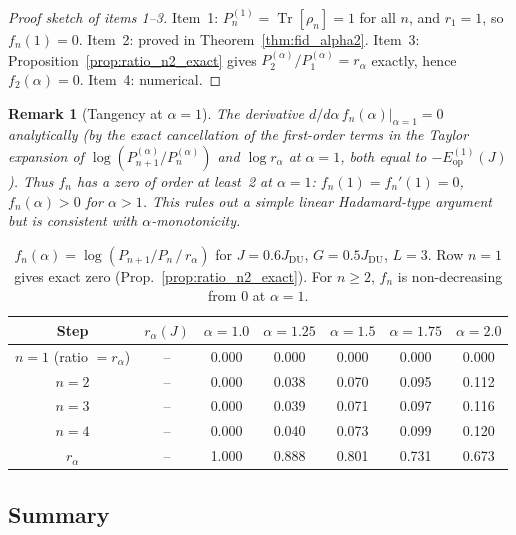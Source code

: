 \documentclass[12pt,a4paper]{article}
\newtheorem{remark}[theorem]{Remark}
\begin{document}
\begin{proof}[Proof sketch of items 1--3]
Item~1: $P_n^{(1)}=\operatorname{Tr}[\rho_n]=1$ for all $n$, and $r_1=1$, so $f_n(1)=0$.
Item~2: proved in Theorem~\ref{thm:fid_alpha2}.
Item~3: Proposition~\ref{prop:ratio_n2_exact} gives $P_2^{(\alpha)}/P_1^{(\alpha)}=r_\alpha$
exactly, hence $f_2(\alpha)=0$.
Item~4: numerical.
\end{proof}

\begin{remark}[Tangency at $\alpha=1$]
The derivative $d/d\alpha\,f_n(\alpha)|_{\alpha=1}=0$ analytically
(by the exact cancellation of the first-order terms in the Taylor expansion
of $\log(P_{n+1}^{(\alpha)}/P_n^{(\alpha)})$ and $\log r_\alpha$ at $\alpha=1$,
both equal to $-E_{\mathrm{op}}^{(1)}(J)$).
Thus $f_n$ has a \emph{zero of order at least~2} at $\alpha=1$:
$f_n(1)=f_n'(1)=0$, $f_n(\alpha)>0$ for $\alpha>1$.
This rules out a simple linear Hadamard-type argument but is consistent with
$\alpha$-monotonicity.
\end{remark}

\begin{table}[h!]
\centering
\caption{$f_n(\alpha)=\log(P_{n+1}/P_n\,/\,r_\alpha)$ for $J=0.6J_\mathrm{DU}$,
$G=0.5J_\mathrm{DU}$, $L=3$.  Row $n=1$ gives exact zero (Prop.~\ref{prop:ratio_n2_exact}).
For $n\geq 2$, $f_n$ is non-decreasing from 0 at $\alpha=1$.}
\label{tab:f_alpha}
\begin{tabular}{c|c|ccccc}
Step & $r_\alpha(J)$ & $\alpha=1.0$ & $\alpha=1.25$ & $\alpha=1.5$ & $\alpha=1.75$ & $\alpha=2.0$ \\
\hline
$n=1$ (ratio $= r_\alpha$) & -- & 0.000 & 0.000 & 0.000 & 0.000 & 0.000 \\
$n=2$ & -- & 0.000 & 0.038 & 0.070 & 0.095 & 0.112 \\
$n=3$ & -- & 0.000 & 0.039 & 0.071 & 0.097 & 0.116 \\
$n=4$ & -- & 0.000 & 0.040 & 0.073 & 0.099 & 0.120 \\
$r_\alpha$ & -- & 1.000 & 0.888 & 0.801 & 0.731 & 0.673 \\
\end{tabular}
\end{table}

\subsection{Summary}
\label{sec:cr_summary}
\end{document}
